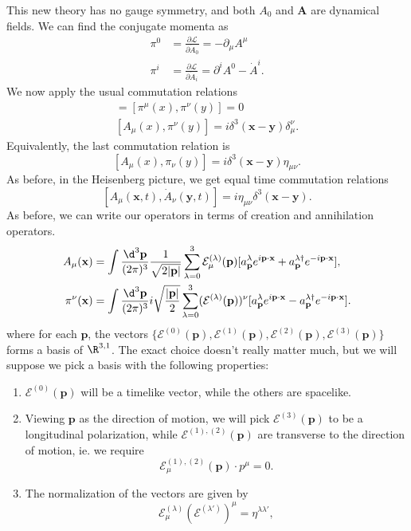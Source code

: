 \documentclass[a4paper]{article}
\begin{document}
This new theory has no gauge symmetry, and both $A_0$ and $\mathbf{A}$ are dynamical fields. We can find the conjugate momenta as
\begin{align*}
  \pi^0 &= \frac{\partial\mathcal{L}}{\partial \dot{A}_0} = - \partial_\mu A^\mu\\
  \pi^i &= \frac{\partial \mathcal{L}}{\partial \dot{A}_i} = \partial^i A^0 - \dot{A}^i.
\end{align*}
We now apply the usual commutation relations
\begin{gather*}
  [A_\mu (x), A_\nu(y)] = [\pi^\mu(x), \pi^\nu(y)] = 0\\
  [A_\mu(x), \pi^\nu(y)] = i\delta^3(\mathbf{x} - \mathbf{y}) \delta_\mu^\nu.
\end{gather*}
Equivalently, the last commutation relation is
\[
  [A_\mu(x), \pi_\nu(y)] = i\delta^3(\mathbf{x} - \mathbf{y}) \eta_{\mu\nu}.
\]
As before, in the Heisenberg picture, we get equal time commutation relations
\[
  [A_\mu (\mathbf{x}, t), \dot{A}_\nu(\mathbf{y}, t)] = i\eta_{\mu\nu} \delta^3(\mathbf{x} - \mathbf{y}).
\]
As before, we can write our operators in terms of creation and annihilation operators.
\begin{align*}
  A_\mu(\mathbf{x}) &= \int \frac{\d^3 \mathbf{p}}{(2\pi)^3} \frac{1}{\sqrt{2 |\mathbf{p}|}} \sum_{\lambda = 0}^3 \mathcal{E}_\mu^{(\lambda)}(\mathbf{p}) [a_\mathbf{p}^\lambda e^{i\mathbf{p}\cdot \mathbf{x}} + a_\mathbf{p}^{\lambda\dagger} e^{-i\mathbf{p}\cdot \mathbf{x}}],\\
  \pi^\nu(\mathbf{x}) &= \int \frac{\d^3 \mathbf{p}}{(2\pi)^3} i\sqrt{\frac{|\mathbf{p}|}{2}} \sum_{\lambda = 0}^3 (\mathcal{E}^{(\lambda)}(\mathbf{p}))^\nu [a_\mathbf{p}^\lambda e^{i\mathbf{p}\cdot \mathbf{x}} - a_\mathbf{p}^{\lambda\dagger} e^{-i\mathbf{p}\cdot \mathbf{x}}].
\end{align*}
where for each $\mathbf{p}$, the vectors $\{\mathcal{E}^{(0)}(\mathbf{p}), \mathcal{E}^{(1)}(\mathbf{p}), \mathcal{E}^{(2)}(\mathbf{p}), \mathcal{E}^{(3)}(\mathbf{p})\}$ forms a basis of $\R^{3, 1}$. The exact choice doesn't really matter much, but we will suppose we pick a basis with the following properties:
\begin{enumerate}
  \item $\mathcal{E}^{(0)}(\mathbf{p})$ will be a timelike vector, while the others are spacelike.
  \item Viewing $\mathbf{p}$ as the direction of motion, we will pick $\mathcal{E}^{(3)}(\mathbf{p})$ to be a longitudinal polarization, while $\mathcal{E}^{(1),(2)}(\mathbf{p})$ are transverse to the direction of motion, ie. we require
    \[
      \mathcal{E}^{(1), (2)}_\mu(\mathbf{p}) \cdot p^\mu = 0.
    \]
  \item The normalization of the vectors are given by
    \[
      \mathcal{E}^{(\lambda)}_\mu (\mathcal{E}^{(\lambda')})^\mu = \eta^{\lambda\lambda'},
    \]
\end{enumerate}
\end{document}
